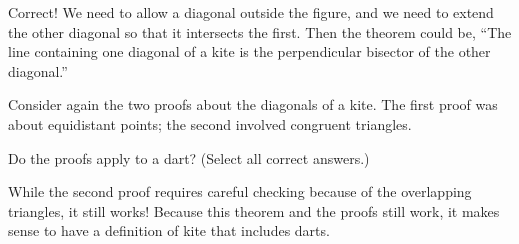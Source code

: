 \documentclass[nooutcomes]{ximera}
\begin{document}
\begin{problem}
\begin{problem}
\begin{problem}
Correct!  We need to allow a diagonal outside the figure, and we need to extend the other diagonal so that it intersects the first.  Then the theorem could be, ``The line containing one diagonal of a kite is the perpendicular bisector of the other diagonal.''

Consider again the two proofs about the diagonals of a kite. The first proof was about equidistant points; the second involved congruent triangles.  

Do the proofs apply to a dart?  (Select all correct answers.)
\begin{selectAll}
\end{selectAll}
\begin{feedback}
While the second proof requires careful checking because of the overlapping triangles, it still works!  Because this theorem and the proofs still work, it makes sense to have a definition of kite that includes darts.  

\end{feedback}
\end{problem}
\end{problem}
\end{problem}
\end{document}
